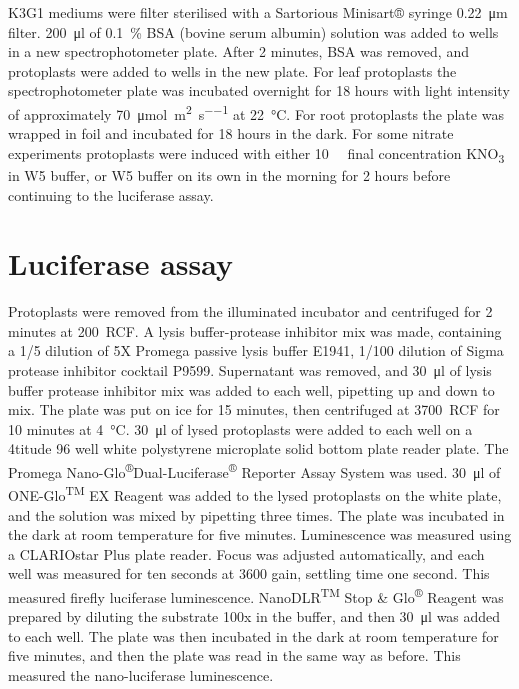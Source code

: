 \documentclass[../main.tex]{subfiles}
\begin{document}
K3G1 mediums were filter sterilised with a Sartorious Minisart® syringe \SI{0.22}{\um} filter.
\SI{200}{\micro\litre} of \SI{0.1}{\percent} BSA (bovine serum albumin) solution was added to wells in a new spectrophotometer plate.
After 2 minutes, BSA was removed, and protoplasts were added to wells in the new plate.
For leaf protoplasts the spectrophotometer plate was incubated overnight for 18 hours with light intensity of approximately \SI{70}{\umol\per\square\meter\per\s} at \SI{22}{\degreeCelsius}.
For root protoplasts the plate was wrapped in foil and incubated for 18 hours in the dark.
For some nitrate experiments protoplasts were induced with either \SI{10}{\milli\Molar} final concentration KNO\textsubscript{3} in W5 buffer, or W5 buffer on its own in the morning for 2 hours before continuing to the luciferase assay.

\section{Luciferase assay}\label{chapter2:methods:luciferase-assay}

Protoplasts were removed from the illuminated incubator and centrifuged for 2 minutes at 200~RCF.
A lysis buffer\hyp{}protease inhibitor mix was made, containing a 1/5 dilution of 5X Promega passive lysis buffer E1941, 1/100 dilution of Sigma protease inhibitor cocktail P9599.
Supernatant was removed, and \SI{30}{\micro\litre} of lysis buffer protease inhibitor mix was added to each well, pipetting up and down to mix.
The plate was put on ice for 15 minutes, then centrifuged at 3700~RCF for 10 minutes at \SI{4}{\degreeCelsius}.
\SI{30}{\micro\litre} of lysed protoplasts were added to each well on a 4titude 96 well white polystyrene microplate solid bottom plate reader plate. 
The Promega Nano\hyp{}Glo\textsuperscript{®}Dual\hyp{}Luciferase\textsuperscript{®} Reporter Assay System was used.
\SI{30}{\micro\litre} of ONE\hyp{}Glo\textsuperscript{TM} EX Reagent was added to the lysed protoplasts on the white plate, and the solution was mixed by pipetting three times.
The plate was incubated in the dark at room temperature for five minutes. Luminescence was measured using a CLARIOstar Plus plate reader.
Focus was adjusted automatically, and each well was measured for ten seconds at 3600 gain, settling time one second.
This measured firefly luciferase luminescence.
NanoDLR\textsuperscript{TM} Stop \& Glo\textsuperscript{®} Reagent was prepared by diluting the substrate 100x in the buffer, and then \SI{30}{\micro\litre} was added to each well.
The plate was then incubated in the dark at room temperature for five minutes, and then the plate was read in the same way as before.
This measured the nano\hyp{}luciferase luminescence.
\end{document}
